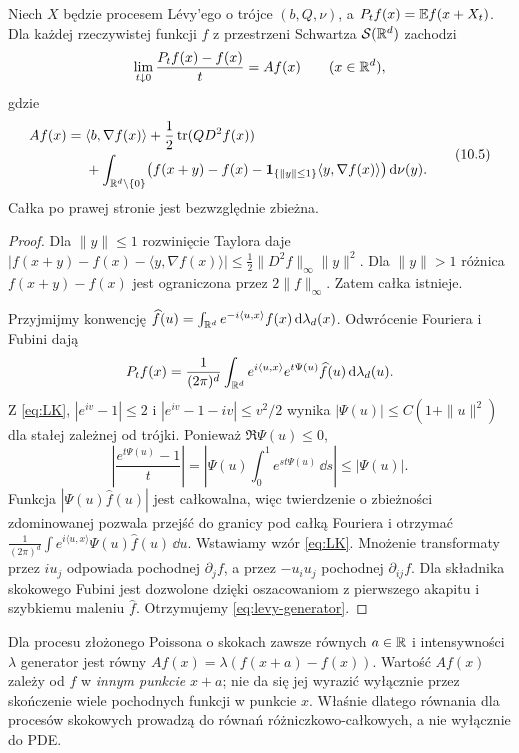 \begin{twierdzenie}
\label{th:levy-generator}
Niech $X$ będzie procesem Lévy'ego o trójce $(b,Q,\nu)$,
a $P_tf(x)=\mathbb{E} f(x+X_t)$. Dla każdej rzeczywistej funkcji
$f$ z przestrzeni Schwartza $\mathcal{S}(\mathbb{R}^d)$ zachodzi
\[
\lim_{t\downarrow0}\frac{P_tf(x)-f(x)}{t}=Af(x)
\qquad (x\in\mathbb{R}^d),
\]
gdzie
\[
\begin{split}
Af(x)={}&\langle b,\nabla f(x)\rangle
+\frac12\operatorname{tr}(QD^2f(x))\\
&+\int_{\mathbb{R}^d\setminus\{0\}}
\bigl(f(x+y)-f(x)
-\mathbf{1}_{\{\|y\|\le1\}}\langle y,\nabla f(x)\rangle\bigr)
\,\mathrm{d}\nu(y).
\end{split}
\tag{10.5}\label{eq:levy-generator}
\]
Całka po prawej stronie jest bezwzględnie zbieżna.
\end{twierdzenie}
\begin{proof}
Dla $\|y\|\le1$ rozwinięcie Taylora daje
$|f(x+y)-f(x)-\langle y,\nabla f(x)\rangle|
\le\frac12\|D^2f\|_\infty\|y\|^2$.
Dla $\|y\|>1$ różnica $f(x+y)-f(x)$ jest ograniczona
przez $2\|f\|_\infty$. Zatem całka istnieje.

Przyjmijmy konwencję
$\widehat f(u)=\int_{\mathbb{R}^d}e^{-i\langle u,x\rangle}
 f(x)\,\mathrm{d}\lambda_d(x)$.
Odwrócenie Fouriera i Fubini dają
\[
P_tf(x)=\frac{1}{(2\pi)^d}\int_{\mathbb{R}^d}
 e^{i\langle u,x\rangle}e^{t\Psi(u)}\widehat f(u)
\,\mathrm{d}\lambda_d(u).
\]
Z \eqref{eq:LK}, $|e^{iv}-1|\le2$ i
$|e^{iv}-1-iv|\le v^2/2$ wynika
$|\Psi(u)|\le C(1+\|u\|^2)$ dla stałej zależnej
od trójki. Ponieważ $\Re\Psi(u)\le0$,
\[
\left|\frac{e^{t\Psi(u)}-1}{t}\right|
=\left|\Psi(u)\int_0^1e^{st\Psi(u)}\,\dd s\right|
\le|\Psi(u)|.
\]
Funkcja $|\Psi(u)\widehat f(u)|$ jest całkowalna,
więc twierdzenie o zbieżności zdominowanej pozwala
przejść do granicy pod całką Fouriera i otrzymać
$\frac1{(2\pi)^d}\int e^{i\langle u,x\rangle}
\Psi(u)\widehat f(u)\,\dd u$.
Wstawiamy wzór \eqref{eq:LK}. Mnożenie transformaty
przez $iu_j$ odpowiada pochodnej $\partial_j f$, a
przez $-u_i u_j$ pochodnej $\partial_{ij}f$.
Dla składnika skokowego Fubini jest dozwolone dzięki
oszacowaniom z pierwszego akapitu i szybkiemu maleniu
$\widehat f$. Otrzymujemy \eqref{eq:levy-generator}.
\end{proof}

\begin{przyklad}
Dla procesu złożonego Poissona o skokach zawsze równych
$a\in\mathbb{R}$ i intensywności $\lambda$ generator jest równy
$Af(x)=\lambda(f(x+a)-f(x))$.
Wartość $Af(x)$ zależy od $f$ w \emph{innym punkcie} $x+a$;
nie da się jej wyrazić wyłącznie przez skończenie wiele
pochodnych funkcji w punkcie $x$. Właśnie dlatego
równania dla procesów skokowych prowadzą do równań
różniczkowo-całkowych, a nie wyłącznie do PDE.
\end{przyklad}

